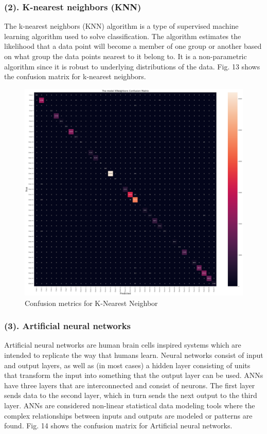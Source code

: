 \documentclass[11 pt,conference,final,]{IEEEtran}
\begin{document}
\subsubsection{(2). K-nearest neighbors
(KNN)}\label{k-nearest-neighbors-knn}

The k-nearest neighbors (KNN) algorithm is a type of supervised machine
learning algorithm used to solve classification. The algorithm estimates
the likelihood that a data point will become a member of one group or
another based on what group the data points nearest to it belong to. It
is a non-parametric algorithm since it is robust to underlying
distributions of the data. Fig. 13 shows the confusion matrix for
k-nearest neighbors.

\begin{figure}

{\centering \includegraphics[width=0.9\linewidth]{img/fig13} 

}

\caption{Confusion metrics for K-Nearest Neighbor}\label{fig:unnamed-chunk-13}
\end{figure}

\subsubsection{(3). Artificial neural
networks}\label{artificial-neural-networks}

Artificial neural networks are human brain cells inspired systems which
are intended to replicate the way that humans learn. Neural networks
consist of input and output layers, as well as (in most cases) a hidden
layer consisting of units that transform the input into something that
the output layer can be used. ANNs have three layers that are
interconnected and consist of neurons. The first layer sends data to the
second layer, which in turn sends the next output to the third layer.
ANNs are considered non-linear statistical data modeling tools where the
complex relationships between inputs and outputs are modeled or patterns
are found. Fig. 14 shows the confusion matrix for Artificial neural
networks.
\end{document}
